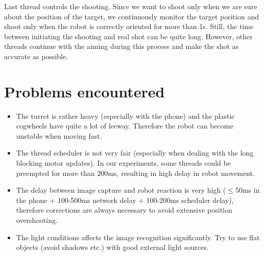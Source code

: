 \documentclass{article}
\begin{document}
Last thread controls the shooting. Since we want to shoot only when we are sure about the position of the target, we continuously monitor the target position and shoot only when the robot is correctly oriented for more than 1s. Still, the time between initiating the shooting and real shot can be quite long. However, other threads continue with the aiming during this process and make the shot as accurate as possible.

\section{Problems encountered}

\begin{itemize}
	\item The turret is rather heavy (especially with the phone) and the plastic cogwheels have quite a lot of leeway. Therefore the robot can become unstable when moving fast.
	\item The thread scheduler is not very fair (especially when dealing with the long blocking motor updates). In our experiments, some threads could be preempted for more than 200ms, resulting in high delay in robot movement.
	\item The delay between image capture and robot reaction is very high ($\leq$50ms in the phone + 100-500ms network delay + 100-200ms scheduler delay), therefore corrections are always necessary to avoid extensive position overshooting.
	\item The light conditions affects the image recognition significantly. Try to use flat objects (avoid shadows etc.) with good external light sources.
\end{itemize}
\end{document}
